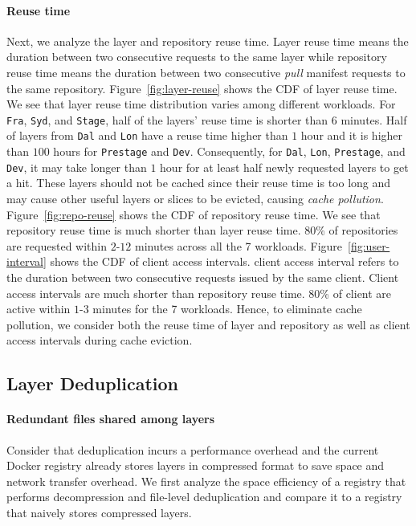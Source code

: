 \paragraph{Reuse time}
Next, we analyze the layer and repository reuse time.
Layer reuse time means the duration between two consecutive requests to the same layer
while repository reuse time means the duration between two consecutive \emph{pull} manifest requests to the same repository.
Figure~\ref{fig:layer-reuse} shows the CDF of layer reuse time. 
We see that layer reuse time distribution varies among different workloads.
For \texttt{Fra}, \texttt{Syd}, and \texttt{Stage},
half of the layers' reuse time is shorter than $6$ minutes.
Half of layers from \texttt{Dal} and \texttt{Lon} have a reuse time higher than $1$ hour and it is higher than $100$ hours for \texttt{Prestage} and \texttt{Dev}.
Consequently, for \texttt{Dal}, \texttt{Lon}, \texttt{Prestage}, and \texttt{Dev}, 
it may take longer than $1$ hour for at least half newly requested layers to get a hit. 
These layers should not be cached since their reuse time is too long and may cause other useful layers or slices to be evicted, \ie causing \emph{cache pollution}.
Figure~\ref{fig:repo-reuse} shows the CDF of repository reuse time.
We see that repository reuse time is much shorter than layer reuse time.
$80$\% of repositories are requested within $2$-$12$ minutes across all the 7 workloads.
Figure~\ref{fig:user-interval} shows the CDF of client access intervals.
client access interval refers to the duration between two consecutive requests issued by the same client.
Client access intervals are much shorter than repository reuse time.
$80$\% of client are active within $1$-$3$ minutes for the 7 workloads. 
Hence, to eliminate cache pollution,
we consider both the reuse time of layer and repository as well as client access intervals during cache eviction.

\subsection{Layer Deduplication}

\paragraph{Redundant files shared among layers}
Consider that deduplication incurs a performance overhead and the current Docker registry already stores layers in compressed format to save space and network transfer overhead. We first analyze the space efficiency of a registry that performs decompression and file-level deduplication and compare it to a registry that naively stores compressed layers.

